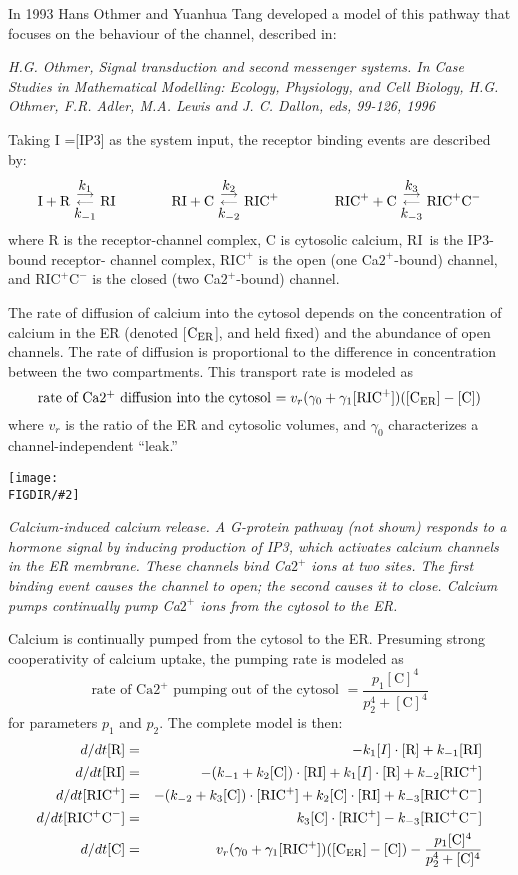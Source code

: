 \documentclass[12pt]{article}
\newcommand{\pic}[2]{\texttt{[image: \\FIGDIR/\#2]}}
\newcommand{\picc}[2]{\centerline{\pic{#1}{#2}}}
\newcommand{\beqn}{\begin{eqnarray*}}
\newcommand{\eeqn}{\end{eqnarray*}}
\newcommand{\arrowschem}[2]{\raisebox{-2ex}%
	{$\stackrel{\stackrel{\displaystyle#1}{\longrightarrow}}%
	{\stackrel{\longleftarrow}{#2}}$}}
\newcommand{\tim}{} %
\newcommand{\CER}{\mbox{C}_{\mbox{\sc er}}}
\newcommand{\RICC}{\mbox{RIC}^+\mbox{C}^-}
\newcommand{\RIC}{\mbox{RIC}^+}
\newcommand{\RI}{\mbox{RI}}
\newcommand{\CC}{\mbox{C}}
\newcommand{\RR}{\mbox{R}}
\begin{document}
In 1993 Hans Othmer and Yuanhua Tang developed a model of this pathway that
focuses on the behaviour of the channel, described in:

\emph{H.G. Othmer, Signal transduction and second messenger systems. In Case
  Studies in Mathematical Modelling: Ecology, Physiology, and Cell Biology,
  H.G. Othmer, F.R. Adler, M.A. Lewis and J. C. Dallon, eds, 99-126, 1996}

Taking I =[IP3] as the system input, the receptor binding events are described
by:
\[
\mbox{I} + \mbox{R} \;\arrowschem{k_1}{k_{-1}}\; \RI
\quad\quad\quad\quad
\RI + \mbox{C} \;\arrowschem{k_2}{k_{-2}}\; \RIC 
\quad\quad\quad\quad
\RIC + \mbox{C}  \;\arrowschem{k_3}{k_{-3}}\; \RICC
\]
where R is the receptor-channel complex, C is cytosolic calcium, \RI\ is the
IP3-bound receptor- channel complex, $\RIC$ is the open (one Ca$2^+$-bound)
channel, and $\RICC$ is the closed (two Ca$2^+$-bound) channel.

The rate of diffusion of calcium into the cytosol depends on the concentration
of calcium in the ER (denoted [$\CER$], and held fixed) and the abundance of open
channels.  The rate of diffusion is proportional to the difference in
concentration between the two compartments. This transport rate is modeled as 
\[
\mbox{rate of Ca$2^+$ diffusion into the cytosol
   $=v_r(\gamma _0+\gamma _1[\RIC])([\CER ]- [\CC])$}
\]
where $v_r$ is the ratio of the ER and cytosolic volumes, and $\gamma _0$
characterizes a channel-independent ``leak.'' 

\picc{0.3}{fig617_ingalls_calcium.png}

\emph{Calcium-induced calcium release. A G-protein pathway (not shown)
  responds to a hormone signal by inducing production of IP3, which activates
  calcium channels in the ER membrane. These channels bind Ca$2^+$ ions at two
  sites. The first binding event causes the channel to open; the second causes
  it to close. Calcium pumps continually pump Ca$2^+$ ions from the cytosol to
  the ER.}


Calcium is continually pumped from the cytosol to the ER.  Presuming strong
cooperativity of calcium uptake, the pumping rate is modeled as
\[
\mbox{rate of Ca$2^+$ pumping out of the cytosol 
$=\frac{p_1[\CC]^4}{p_2^4+[\CC]^4 }$}
\]
for parameters $p_1$ and $p_2$. 
The complete model is then: 
\beqn
d/dt[\RR]\tim &=& -k_{1}[I]\tim \cdot [\RR]\tim +k_{-1}[\RI]\tim \\
d/dt[\RI]\tim &=& -(k_{-1}+ 
k_2[\CC]\tim )\cdot [\RI]\tim +
k_{1}[I]\tim \cdot [\RR]\tim +
k_{-2}[\RIC]\tim \\
d/dt[\RIC]\tim &=& -(k_{-2}+
k_3[\CC]\tim )\cdot [\RIC]\tim +
k_2[\CC]\tim \cdot [\RI]\tim +
k_{-3}[\RICC]\tim \\
d/dt[\RICC]\tim &=& k_3[\CC]\tim \cdot [\RIC]\tim - 
k_{-3}[\RICC]\tim \\
d/dt[\CC]\tim &=& v_r(\gamma _0+\gamma _1[\RIC])([\CER ]- [\CC])
- \frac{p_1[\CC]^4}{p_2^4+[\CC]^4 }
\eeqn
\end{document}
